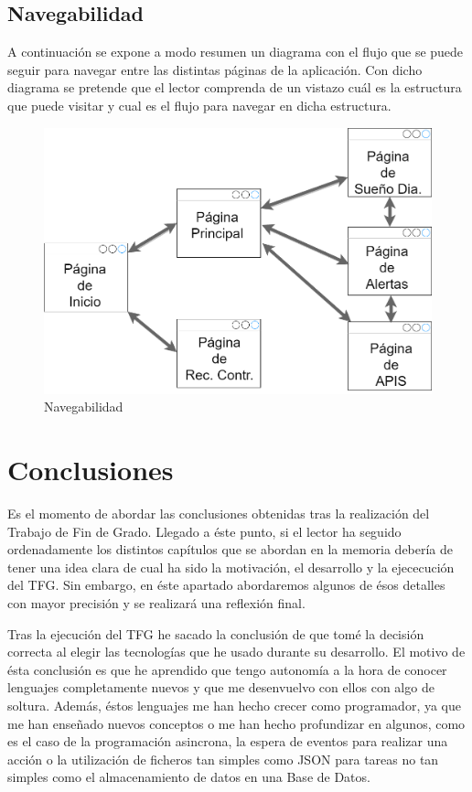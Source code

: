 \documentclass[11pt,openany]{book}
\begin{document}
\pagebreak
\section{Navegabilidad}

A continuación se expone a modo resumen un diagrama con el flujo que se puede seguir para navegar entre las distintas páginas de la aplicación. Con dicho diagrama se pretende que el lector comprenda de un vistazo cuál es la estructura que puede visitar y cual es el flujo para navegar en dicha estructura.

\begin{figure}[H]
\centering
\includegraphics[totalheight=9cm]{manualUsuario/Navegabilidad.png}
\caption{Navegabilidad}
\end{figure}


\chapter{Conclusiones}

Es el momento de abordar las conclusiones obtenidas tras la realización del Trabajo de Fin de Grado. Llegado a éste punto, si el lector ha seguido ordenadamente los distintos capítulos que se abordan en la memoria debería de tener una idea clara de cual ha sido la motivación, el desarrollo y la ejececución del TFG. Sin embargo, en éste apartado abordaremos algunos de ésos detalles con mayor precisión y se realizará una reflexión final.

Tras la ejecución del TFG he sacado la conclusión de que tomé la decisión correcta al elegir las tecnologías que he usado durante su desarrollo. El motivo de ésta conclusión es que he aprendido que tengo autonomía a la hora de conocer lenguajes completamente nuevos y que me desenvuelvo con ellos con algo de soltura. Además, éstos lenguajes me han hecho crecer como programador, ya que me han enseñado nuevos conceptos o me han hecho profundizar en algunos, como es el caso de la programación asincrona, la espera de eventos para realizar una acción o la utilización de ficheros tan simples como JSON para tareas no tan simples como el almacenamiento de datos en una Base de Datos.
\end{document}
